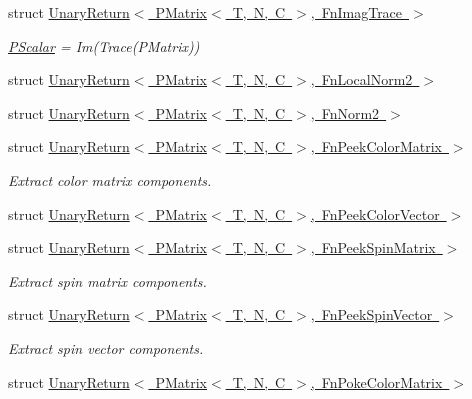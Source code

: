 \begin{DoxyCompactItemize}
struct \mbox{\hyperlink{structENSEM_1_1UnaryReturn_3_01PMatrix_3_01T_00_01N_00_01C_01_4_00_01FnImagTrace_01_4}{Unary\+Return$<$ P\+Matrix$<$ T, N, C $>$, Fn\+Imag\+Trace $>$}}
\begin{DoxyCompactList}\small\item\em \mbox{\hyperlink{classENSEM_1_1PScalar}{P\+Scalar}} = Im(\+Trace(\+P\+Matrix)) \end{DoxyCompactList}\item 
struct \mbox{\hyperlink{structENSEM_1_1UnaryReturn_3_01PMatrix_3_01T_00_01N_00_01C_01_4_00_01FnLocalNorm2_01_4}{Unary\+Return$<$ P\+Matrix$<$ T, N, C $>$, Fn\+Local\+Norm2 $>$}}
\item 
struct \mbox{\hyperlink{structENSEM_1_1UnaryReturn_3_01PMatrix_3_01T_00_01N_00_01C_01_4_00_01FnNorm2_01_4}{Unary\+Return$<$ P\+Matrix$<$ T, N, C $>$, Fn\+Norm2 $>$}}
\item 
struct \mbox{\hyperlink{structENSEM_1_1UnaryReturn_3_01PMatrix_3_01T_00_01N_00_01C_01_4_00_01FnPeekColorMatrix_01_4}{Unary\+Return$<$ P\+Matrix$<$ T, N, C $>$, Fn\+Peek\+Color\+Matrix $>$}}
\begin{DoxyCompactList}\small\item\em Extract color matrix components. \end{DoxyCompactList}\item 
struct \mbox{\hyperlink{structENSEM_1_1UnaryReturn_3_01PMatrix_3_01T_00_01N_00_01C_01_4_00_01FnPeekColorVector_01_4}{Unary\+Return$<$ P\+Matrix$<$ T, N, C $>$, Fn\+Peek\+Color\+Vector $>$}}
\item 
struct \mbox{\hyperlink{structENSEM_1_1UnaryReturn_3_01PMatrix_3_01T_00_01N_00_01C_01_4_00_01FnPeekSpinMatrix_01_4}{Unary\+Return$<$ P\+Matrix$<$ T, N, C $>$, Fn\+Peek\+Spin\+Matrix $>$}}
\begin{DoxyCompactList}\small\item\em Extract spin matrix components. \end{DoxyCompactList}\item 
struct \mbox{\hyperlink{structENSEM_1_1UnaryReturn_3_01PMatrix_3_01T_00_01N_00_01C_01_4_00_01FnPeekSpinVector_01_4}{Unary\+Return$<$ P\+Matrix$<$ T, N, C $>$, Fn\+Peek\+Spin\+Vector $>$}}
\begin{DoxyCompactList}\small\item\em Extract spin vector components. \end{DoxyCompactList}\item 
struct \mbox{\hyperlink{structENSEM_1_1UnaryReturn_3_01PMatrix_3_01T_00_01N_00_01C_01_4_00_01FnPokeColorMatrix_01_4}{Unary\+Return$<$ P\+Matrix$<$ T, N, C $>$, Fn\+Poke\+Color\+Matrix $>$}}

\end{DoxyCompactItemize}
